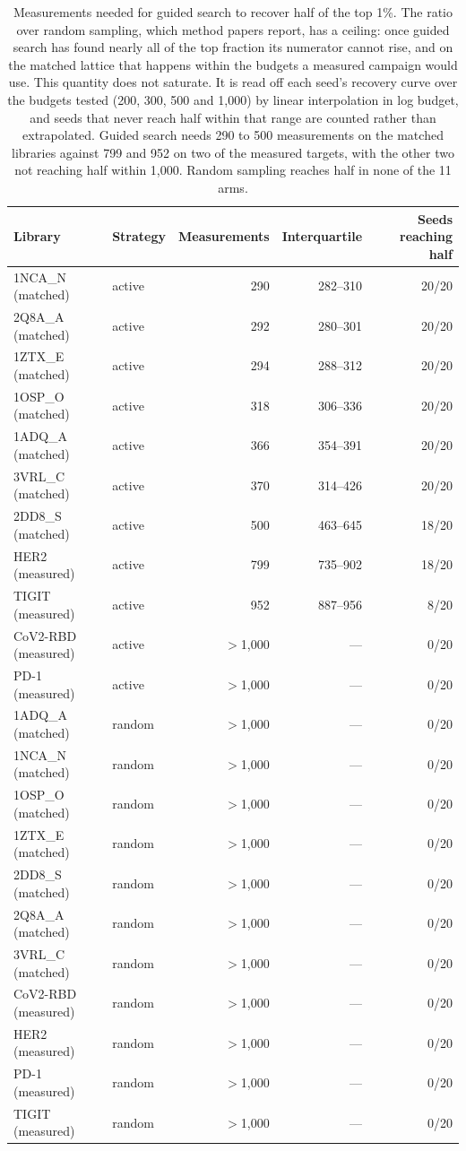 \documentclass[11pt,a4paper]{article}
\begin{document}
\begin{table}[h]
\caption{Measurements needed for guided search to recover half of the top 1\%. The ratio over random sampling, which method papers report, has a ceiling: once guided search has found nearly all of the top fraction its numerator cannot rise, and on the matched lattice that happens within the budgets a measured campaign would use. This quantity does not saturate. It is read off each seed's recovery curve over the budgets tested (200, 300, 500 and 1{,}000) by linear interpolation in log budget, and seeds that never reach half within that range are counted rather than extrapolated. Guided search needs 290 to 500 measurements on the matched libraries against 799 and 952 on two of the measured targets, with the other two not reaching half within 1{,}000. Random sampling reaches half in none of the 11 arms.}
\centering
\begin{tabular}{@{}llrrr@{}}
\toprule
Library & Strategy & Measurements & Interquartile & Seeds reaching half \\
\midrule
1NCA\_N (matched) & active & 290 & 282--310 & 20/20 \\
2Q8A\_A (matched) & active & 292 & 280--301 & 20/20 \\
1ZTX\_E (matched) & active & 294 & 288--312 & 20/20 \\
1OSP\_O (matched) & active & 318 & 306--336 & 20/20 \\
1ADQ\_A (matched) & active & 366 & 354--391 & 20/20 \\
3VRL\_C (matched) & active & 370 & 314--426 & 20/20 \\
2DD8\_S (matched) & active & 500 & 463--645 & 18/20 \\
HER2 (measured) & active & 799 & 735--902 & 18/20 \\
TIGIT (measured) & active & 952 & 887--956 & 8/20 \\
CoV2-RBD (measured) & active & $>$1{,}000 & --- & 0/20 \\
PD-1 (measured) & active & $>$1{,}000 & --- & 0/20 \\
1ADQ\_A (matched) & random & $>$1{,}000 & --- & 0/20 \\
1NCA\_N (matched) & random & $>$1{,}000 & --- & 0/20 \\
1OSP\_O (matched) & random & $>$1{,}000 & --- & 0/20 \\
1ZTX\_E (matched) & random & $>$1{,}000 & --- & 0/20 \\
2DD8\_S (matched) & random & $>$1{,}000 & --- & 0/20 \\
2Q8A\_A (matched) & random & $>$1{,}000 & --- & 0/20 \\
3VRL\_C (matched) & random & $>$1{,}000 & --- & 0/20 \\
CoV2-RBD (measured) & random & $>$1{,}000 & --- & 0/20 \\
HER2 (measured) & random & $>$1{,}000 & --- & 0/20 \\
PD-1 (measured) & random & $>$1{,}000 & --- & 0/20 \\
TIGIT (measured) & random & $>$1{,}000 & --- & 0/20 \\
\bottomrule
\end{tabular}
\end{table}
\end{document}
